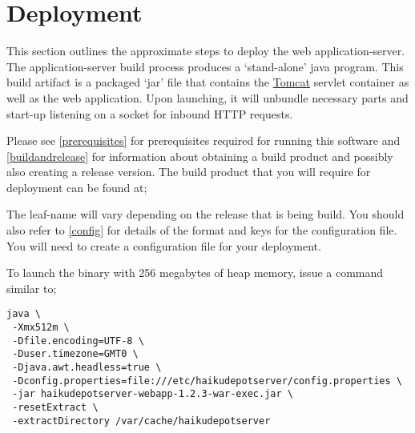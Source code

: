 
\section{Deployment}

This section outlines the approximate steps to deploy the web application-server.  The application-server build process produces a  `stand-alone' java program.  This build artifact is a packaged `jar' file that contains the \href{http://tomcat.apache.org}{Tomcat} servlet container as well as the web application.  Upon launching, it will unbundle necessary parts and start-up listening on a socket for inbound HTTP requests.



Please see \ref{prerequisites} for prerequisites required for running this software and \ref{buildandrelease} for information about obtaining a build product and possibly also creating a release version.  The build product that you will require for deployment can be found at;


The leaf-name will vary depending on the release that is being build.  You should also refer to \ref{config} for details of the format and keys for the configuration file.  You will need to create a configuration file for your deployment.

To launch the binary with 256 megabytes of heap memory, issue a command similar to;

\begin{verbatim}
java \
 -Xmx512m \
 -Dfile.encoding=UTF-8 \
 -Duser.timezone=GMT0 \
 -Djava.awt.headless=true \
 -Dconfig.properties=file:///etc/haikudepotserver/config.properties \
 -jar haikudepotserver-webapp-1.2.3-war-exec.jar \
 -resetExtract \
 -extractDirectory /var/cache/haikudepotserver
\end{verbatim}

